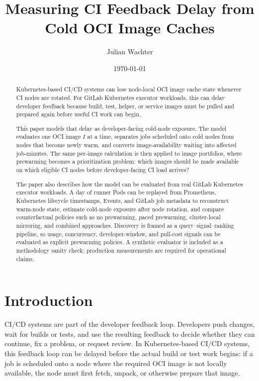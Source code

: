 \documentclass[11pt,a4paper]{article}
\title{Measuring CI Feedback Delay from Cold OCI Image Caches}
\author{Julian Wachter}
\date{\today}
\begin{document}
\maketitle


\begin{abstract}
Kubernetes-based CI/CD systems can lose node-local OCI image cache state whenever CI nodes are rotated. For GitLab Kubernetes executor workloads, this can delay developer feedback because build, test, helper, or service images must be pulled and prepared again before useful CI work can begin.

This paper models that delay as developer-facing cold-node exposure. The model evaluates one OCI image \(I\) at a time, separates jobs scheduled onto cold nodes from nodes that become newly warm, and converts image-availability waiting into affected job-minutes. The same per-image calculation is then applied to image portfolios, where prewarming becomes a prioritization problem: which images should be made available on which eligible CI nodes before developer-facing CI load arrives?

The paper also describes how the model can be evaluated from real GitLab Kubernetes executor workloads. A day of runner Pods can be replayed from Prometheus, Kubernetes lifecycle timestamps, Events, and GitLab job metadata to reconstruct warm-node state, estimate cold-node exposure after node rotation, and compare counterfactual policies such as no prewarming, paced prewarming, cluster-local mirroring, and combined approaches. Discovery is framed as a query--signal--ranking pipeline, so usage, concurrency, developer-window, and pull-cost signals can be evaluated as explicit prewarming policies. A synthetic evaluator is included as a methodology sanity check; production measurements are required for operational claims.
\end{abstract}

\section{Introduction}

CI/CD systems are part of the developer feedback loop. Developers push changes, wait for builds or tests, and use the resulting feedback to decide whether they can continue, fix a problem, or request review. In Kubernetes-based CI/CD systems, this feedback loop can be delayed before the actual build or test work begins: if a job is scheduled onto a node where the required OCI image is not locally available, the node must first fetch, unpack, or otherwise prepare that image.
\end{document}
